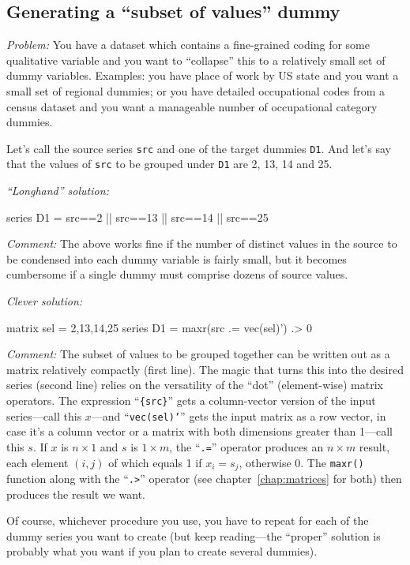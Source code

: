 \subsection{Generating a ``subset of values'' dummy}

\emph{Problem:} You have a dataset which contains a fine-grained
coding for some qualitative variable and you want to ``collapse'' this
to a relatively small set of dummy variables. Examples: you have place
of work by US state and you want a small set of regional dummies; or
you have detailed occupational codes from a census dataset and you
want a manageable number of occupational category dummies.

Let's call the source series \texttt{src} and one of the target dummies
\texttt{D1}. And let's say that the values of \texttt{src} to be grouped
under \texttt{D1} are 2, 13, 14 and 25.

\emph{``Longhand'' solution:}
\begin{code}
series D1 = src==2 || src==13 || src==14 || src==25
\end{code}

\emph{Comment:} The above works fine if the number of distinct values
in the source to be condensed into each dummy variable is fairly
small, but it becomes cumbersome if a single dummy must comprise
dozens of source values.

\emph{Clever solution:}
\begin{code}
matrix sel = {2,13,14,25}
series D1 = maxr({src} .= vec(sel)') .> 0
\end{code}

\emph{Comment:} The subset of values to be grouped together can be
written out as a matrix relatively compactly (first line). The magic
that turns this into the desired series (second line) relies on the
versatility of the ``dot'' (element-wise) matrix operators. The
expression ``\texttt{\{src\}}'' gets a column-vector version of the
input series---call this $x$---and ``\texttt{vec(sel)'}'' gets the
input matrix as a row vector, in case it's a column vector or a matrix
with both dimensions greater than 1---call this $s$. If $x$ is
$n\times1$ and $s$ is $1\times m$, the ``\texttt{.=}'' operator
produces an $n\times m$ result, each element $(i,j)$ of which equals 1
if $x_i = s_j$, otherwise 0. The \texttt{maxr()} function along with
the ``\verb|.>|'' operator (see chapter~\ref{chap:matrices} for both)
then produces the result we want.

Of course, whichever procedure you use, you have to repeat for each of
the dummy series you want to create (but keep reading---the ``proper''
solution is probably what you want if you plan to create several
dummies).


